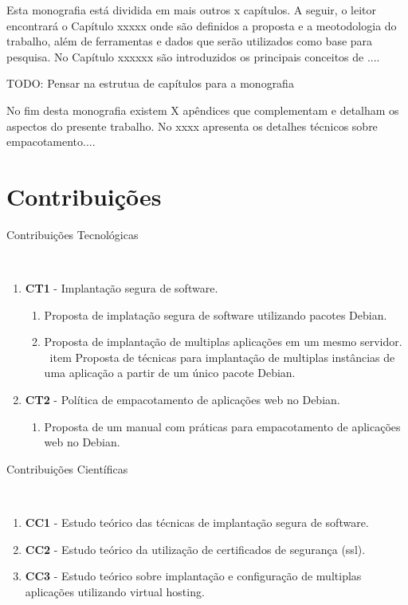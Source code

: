 %

Esta monografia está dividida em mais outros x capítulos. A seguir, o leitor
encontrará o Capítulo xxxxx onde são definidos a proposta e
a meotodologia do trabalho, além de ferramentas e dados que serão utilizados
como base para pesquisa. No Capítulo xxxxxx
são introduzidos os principais conceitos de  ....

TODO: Pensar na estrutua de capítulos para a monografia

No fim desta monografia existem X apêndices que complementam e detalham os
aspectos do presente trabalho. No  xxxx apresenta os detalhes
técnicos sobre empacotamento....

\section{Contribuições}
%
\begin{description}
  \item [Contribuições Tecnológicas]\
\end{description}
    \begin{enumerate}
      \item \textbf{CT1} - Implantação segura de software.
        \begin{enumerate}
          \item Proposta de implatação segura de software utilizando pacotes
          Debian.
          \item Proposta de implantação de multiplas aplicações em um mesmo
          servidor.
          \ item Proposta de técnicas para implantação de multiplas instâncias
           de uma aplicação a partir de um único pacote Debian.
        \end{enumerate}
      \item \textbf{CT2} - Política de empacotamento de aplicações web no Debian.
            \begin{enumerate}
              \item  Proposta de um manual com práticas para empacotamento de
              aplicações web no Debian.
            \end{enumerate}
    \end{enumerate}
\begin{description}
  \item [Contribuições Científicas]\
\end{description}
     \begin{enumerate}
      \item \textbf{CC1} - Estudo teórico das técnicas de implantação segura de
      software.
      \item \textbf{CC2} - Estudo teórico da utilização de certificados de
      segurança (ssl).
      \item \textbf{CC3} - Estudo teórico sobre implantação e configuração de
      multiplas aplicações utilizando virtual hosting.
     \end{enumerate}

